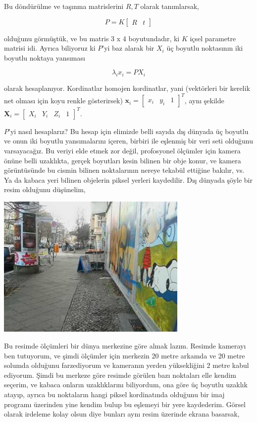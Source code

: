 \documentclass[12pt,fleqn]{article}\usepackage{../../common}
\begin{document}
Bu döndürülme ve taşınma matrislerini $R,T$ olarak tanımlarsak,

$$ P = K \left[\begin{array}{c|c} R & t \end{array}\right]$$

olduğunu görmüştük, ve bu matris 3 x 4 boyutundadır, ki $K$ içsel parametre
matrisi idi. Ayrıca biliyoruz ki $P$'yi baz alarak bir $X_i$ üç boyutlu
noktasının iki boyutlu noktaya yansıması

$$ \lambda_i x_i = PX_i$$

olarak hesaplanıyor. Kordinatlar homojen kordinatlar, yani (vektörleri bir
kerelik net olması için koyu renkle gösterirsek)
$\mathbf{x}_i = \left[\begin{array}{ccc}x_i&y_i&1\end{array}\right]^T$,
aynı şekilde
$\mathbf{X}_i=\left[\begin{array}{cccc}X_i&Y_i&Z_i&1\end{array}\right]^T$.

$P$'yi nasıl hesaplarız? Bu hesap için elimizde belli sayıda dış dünyada üç
boyutlu ve onun iki boyutlu yansımalarını içeren, birbiri ile eşlenmiş bir
veri seti olduğunu varsayacağız. Bu veriyi elde etmek zor değil,
profosyonel ölçümler için kamera önüne belli uzaklıkta, gerçek boyutları
kesin bilinen bir obje konur, ve kamera görüntüsünde bu cismin bilinen
noktalarının nereye tekabül ettiğine bakılır, vs. Ya da kabaca yeri bilinen
objelerin piksel yerleri kaydedilir. Dış dünyada şöyle bir resim olduğunu
düşünelim,

\includegraphics[width=25em]{out-cam.png}

Bu resimde ölçümleri bir dünya merkezine göre almak lazım. Resimde kamerayı
ben tutuyorum, ve şimdi ölçümler için merkezin 20 metre arkamda ve 20 metre
solumda olduğunu farzediyorum ve kameranın yerden yüksekliğini 2 metre
kabul ediyorum. Şimdi bu merkeze göre resimde görülen bazı noktaları elle
kendim seçerim, ve kabaca onların uzaklıklarını biliyordum, ona göre üç
boyutlu uzaklık atayıp, ayrıca bu noktaların hangi piksel kordinatında
olduğunu bir imaj programı üzerinden yine kendim bulup bu eşlemeyi bir yere
kaydederim. Görsel olarak irdeleme kolay olsun diye bunları aynı resim
üzerinde ekrana basarsak,
\end{document}

